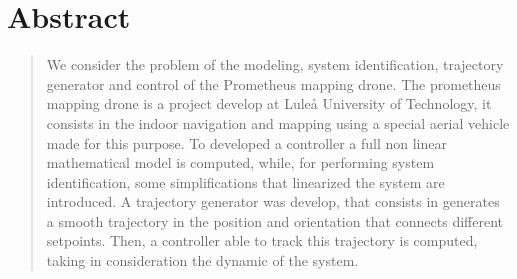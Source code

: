 \documentclass[11pt, a4paper, onecolumn, fleqn, twoside, titlepage, openright]{book}
\begin{document}
	\clearpage


	\chapter*{Abstract}
	\label{abstract}

	\begin{quote}
		We consider the problem of the modeling, system identification, trajectory generator and control of the Prometheus mapping drone. The prometheus mapping drone is a project develop at Lule\r{a} University of Technology, it consists in the indoor navigation and mapping using a special aerial vehicle made for this purpose. To developed a controller a full non linear mathematical model is computed, while, for performing system identification, some simplifications that linearized the system are introduced. A trajectory generator was develop, that consists in generates a smooth trajectory in the position and orientation that connects different setpoints. Then, a controller able to track this trajectory is computed, taking in consideration the dynamic of the system.
	\end{quote}


	\tableofcontents	


	


	



	



	
\end{document}
